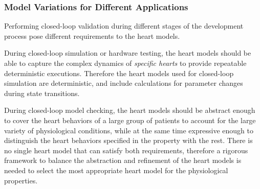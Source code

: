 \documentclass[a4paper]{article}
\begin{document}
\subsubsection{Model Variations for Different Applications}
Performing closed-loop validation during different stages of the development process pose different requirements to the heart models.

During closed-loop simulation or hardware testing, the heart models should be able to capture the complex dynamics of \emph{specific hearts} to provide repeatable deterministic executions.
Therefore the heart models used for closed-loop simulation are deterministic, and include calculations for parameter changes during state transitions.

During closed-loop model checking, the heart models should be abstract enough to cover the heart behaviors of a large group of patients to account for the large variety of physiological conditions, while at the same time expressive enough to distinguish the heart behaviors specified in the property with the rest.
There is no single heart model that can satisfy both requirements, therefore a rigorous framework to balance the abstraction and refinement of the heart models is needed to select the most appropriate heart model for the physiological properties.
\end{document}
